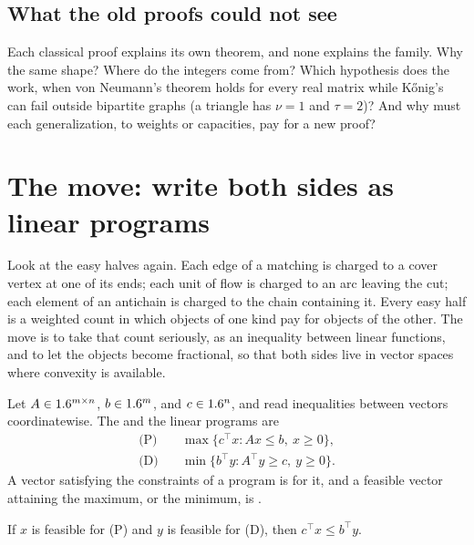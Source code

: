 \begin{refsection}
\subsection{What the old proofs could not see}

Each classical proof explains its own theorem, and none explains the family. Why the same shape? Where do the integers come from? Which hypothesis does the work, when von Neumann's theorem holds for every real matrix while K\H{o}nig's can fail outside bipartite graphs (a triangle has $\nu=1$ and $\tau=2$)? And why must each generalization, to weights or capacities, pay for a new proof?

\section{The move: write both sides as linear programs}\label{sec:lpduality:move}

Look at the easy halves again. Each edge of a matching is charged to a cover vertex at one of its ends; each unit of flow is charged to an arc leaving the cut; each element of an antichain is charged to the chain containing it. Every easy half is a weighted count in which objects of one kind pay for objects of the other. The move is to take that count seriously, as an inequality between linear functions, and to let the objects become fractional, so that both sides live in vector spaces where convexity is available.

\begin{definition}\label{def:lpduality:pair}
Let $A\in1.6^{m\times n}$, $b\in1.6^m$, and $c\in1.6^n$, and read inequalities between vectors coordinatewise. The  and the  linear programs are
\begin{align*}
\text{(P)}\quad&\max\{c^\top x: Ax\le b,\ x\ge0\},\\
\text{(D)}\quad&\min\{b^\top y: A^\top y\ge c,\ y\ge0\}.
\end{align*}
A vector satisfying the constraints of a program is  for it, and a feasible vector attaining the maximum, or the minimum, is .
\end{definition}

\begin{lemma}\label{lem:lpduality:weak}
If $x$ is feasible for \textup{(P)} and $y$ is feasible for \textup{(D)}, then $c^\top x\le b^\top y$.
\end{lemma}


\end{refsection}
